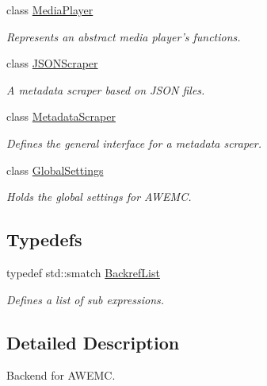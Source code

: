 \begin{DoxyCompactItemize}
class \hyperlink{class_a_w_e_1_1_media_player}{Media\-Player}
\begin{DoxyCompactList}\small\item\em Represents an abstract media player's functions. \end{DoxyCompactList}\item 
class \hyperlink{class_a_w_e_1_1_j_s_o_n_scraper}{J\-S\-O\-N\-Scraper}
\begin{DoxyCompactList}\small\item\em A metadata scraper based on J\-S\-O\-N files. \end{DoxyCompactList}\item 
class \hyperlink{class_a_w_e_1_1_metadata_scraper}{Metadata\-Scraper}
\begin{DoxyCompactList}\small\item\em Defines the general interface for a metadata scraper. \end{DoxyCompactList}\item 
class \hyperlink{class_a_w_e_1_1_global_settings}{Global\-Settings}
\begin{DoxyCompactList}\small\item\em Holds the global settings for A\-W\-E\-M\-C. \end{DoxyCompactList}\end{DoxyCompactItemize}
\subsection*{Typedefs}
\begin{DoxyCompactItemize}
\item 
\hypertarget{namespace_a_w_e_a6425b9fb4ff7b11381265900002fbfaa}{typedef std\-::smatch \hyperlink{namespace_a_w_e_a6425b9fb4ff7b11381265900002fbfaa}{Backref\-List}}\label{namespace_a_w_e_a6425b9fb4ff7b11381265900002fbfaa}

\begin{DoxyCompactList}\small\item\em Defines a list of sub expressions. \end{DoxyCompactList}\end{DoxyCompactItemize}


\subsection{Detailed Description}
Backend for A\-W\-E\-M\-C. 